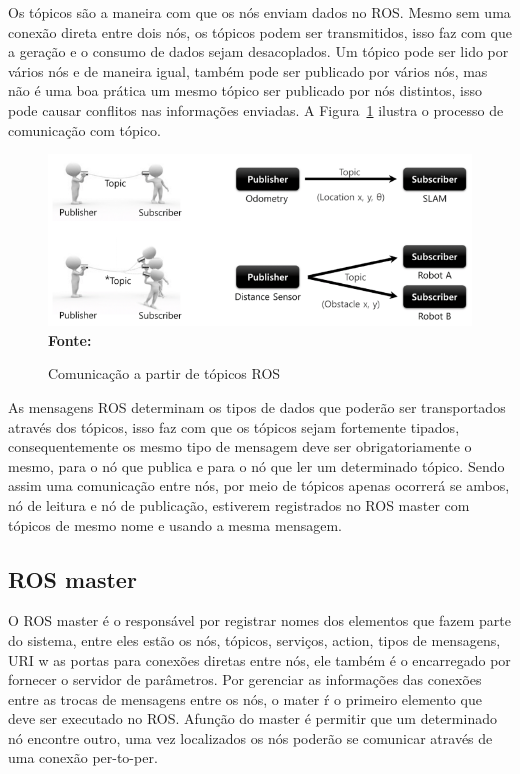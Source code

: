Os tópicos são a maneira com que os nós enviam dados no ROS\@. Mesmo sem uma conexão direta entre dois nós, os tópicos podem ser transmitidos, isso faz com que a geração e o consumo de dados sejam desacoplados. Um tópico pode ser lido por vários nós e de maneira igual, também pode ser publicado por vários nós, mas não é uma boa prática um mesmo tópico ser publicado por nós distintos, isso pode causar conflitos nas informações enviadas. A Figura~\ref{fig:rostopic} ilustra o processo de comunicação com tópico.

\begin{figure}[ht]
	\caption{Comunicação a partir de tópicos ROS}
	\begin{center}
		\includegraphics[scale=0.51]{imagens/rostopic.png}\\
		{\small \textbf{Fonte:} }
    \end{center}\label{fig:rostopic}
\end{figure}

As mensagens ROS determinam os tipos de dados que poderão ser transportados através dos tópicos, isso faz com que os tópicos sejam fortemente tipados, consequentemente os mesmo tipo de mensagem deve ser obrigatoriamente o mesmo, para o nó que publica e para o nó que ler um determinado tópico. Sendo assim uma comunicação entre nós, por meio de tópicos apenas ocorrerá se ambos, nó de leitura e nó de publicação, estiverem registrados no ROS master com tópicos de mesmo nome e usando a mesma mensagem.


\subsection{ROS master}

O ROS master é o responsável por registrar nomes dos elementos que fazem parte do sistema, entre eles estão os nós, tópicos, serviços, action, tipos de mensagens, URI w as portas para conexões diretas entre nós, ele também é o encarregado por fornecer o servidor de parâmetros. Por gerenciar as informações das conexões entre as trocas de mensagens entre os nós, o mater ŕ o primeiro elemento que deve ser executado no ROS. Afunção do master é permitir que um determinado nó encontre outro, uma vez localizados os nós poderão se comunicar através de uma conexão per-to-per.

